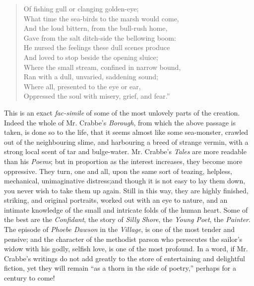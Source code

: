 \begin{verse}
  Of fishing gull or clanging golden-eye;\\
  What time the sea-birds to the marsh would come,\\
  And the loud bittern, from the bull-rush home,\\
  Gave from the salt ditch-side the bellowing boom:\\
  He nursed the feelings these dull scenes produce\\
  And loved to stop beside the opening sluice;\\
  Where the small stream, confined in narrow bound,\\
  Ran with a dull, unvaried, saddening sound;\\
  Where all, presented to the eye or ear,\\
  Oppressed the soul with misery, grief, and fear.''
\end{verse}
This is an exact \emph{fac-simile} of some of the most unlovely parts of the
creation. Indeed the whole of Mr. Crabbe's \emph{Borough}, from which the
above passage is taken, is done so to the life, that it seems almost
like some sea-monster, crawled out of the neighbouring slime, and
harbouring a breed of strange vermin, with a strong local scent of
tar and bulge-water. Mr. Crabbe's \emph{Tales} are more readable than his
\emph{Poems}; but in proportion as the interest increases, they become more
oppressive. They turn, one and all, upon the same sort of teazing,
helpless, mechanical, unimaginative distress;\textemdash and though it is not
easy to lay them down, you never wish to take them up again. Still in
this way, they are highly finished, striking, and original portraits,
worked out with an eye to nature, and an intimate knowledge of the
small and intricate folds of the human heart. Some of the best are
the \emph{Confidant}, the story of \emph{Silly Shore}, the \emph{Young Poet}, the
\emph{Painter}. The episode of \emph{Phoebe Dawson} in the \emph{Village}, is one of
the most tender and pensive; and the character of the methodist parson
who persecutes the sailor's widow with his godly, selfish love, is one
of the most profound. In a word, if Mr. Crabbe's writings do not add
greatly to the store of entertaining and delightful fiction, yet they
will remain ``as a thorn in the side of poetry,'' perhaps for a century to
come!
